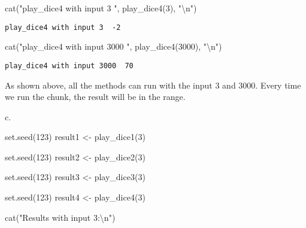 \documentclass[
  letterpaper,
  DIV=11,
  numbers=noendperiod]{scrartcl}
\newenvironment{Shaded}{\begin{snugshade}}{\end{snugshade}}
\newcommand{\DecValTok}[1]{\textcolor[rgb]{0.68,0.00,0.00}{#1}}
\newcommand{\FunctionTok}[1]{\textcolor[rgb]{0.28,0.35,0.67}{#1}}
\newcommand{\NormalTok}[1]{\textcolor[rgb]{0.00,0.23,0.31}{#1}}
\newcommand{\OtherTok}[1]{\textcolor[rgb]{0.00,0.23,0.31}{#1}}
\newcommand{\SpecialCharTok}[1]{\textcolor[rgb]{0.37,0.37,0.37}{#1}}
\newcommand{\StringTok}[1]{\textcolor[rgb]{0.13,0.47,0.30}{#1}}
\begin{document}
\begin{Shaded}
\begin{Highlighting}[]
\FunctionTok{cat}\NormalTok{(}\StringTok{"play\_dice4 with input 3 "}\NormalTok{, }\FunctionTok{play\_dice4}\NormalTok{(}\DecValTok{3}\NormalTok{), }\StringTok{"}\SpecialCharTok{\textbackslash{}n}\StringTok{"}\NormalTok{)}
\end{Highlighting}
\end{Shaded}

\begin{verbatim}
play_dice4 with input 3  -2 
\end{verbatim}

\begin{Shaded}
\begin{Highlighting}[]
\FunctionTok{cat}\NormalTok{(}\StringTok{"play\_dice4 with input 3000 "}\NormalTok{, }\FunctionTok{play\_dice4}\NormalTok{(}\DecValTok{3000}\NormalTok{), }\StringTok{"}\SpecialCharTok{\textbackslash{}n}\StringTok{"}\NormalTok{)}
\end{Highlighting}
\end{Shaded}

\begin{verbatim}
play_dice4 with input 3000  70 
\end{verbatim}

As shown above, all the methods can run with the input 3 and 3000. Every
time we run the chunk, the result will be in the range.

c.

\begin{Shaded}
\begin{Highlighting}[]
\FunctionTok{set.seed}\NormalTok{(}\DecValTok{123}\NormalTok{)}
\NormalTok{result1 }\OtherTok{\textless{}{-}} \FunctionTok{play\_dice1}\NormalTok{(}\DecValTok{3}\NormalTok{)}

\FunctionTok{set.seed}\NormalTok{(}\DecValTok{123}\NormalTok{)}
\NormalTok{result2 }\OtherTok{\textless{}{-}} \FunctionTok{play\_dice2}\NormalTok{(}\DecValTok{3}\NormalTok{)}

\FunctionTok{set.seed}\NormalTok{(}\DecValTok{123}\NormalTok{)}
\NormalTok{result3 }\OtherTok{\textless{}{-}} \FunctionTok{play\_dice3}\NormalTok{(}\DecValTok{3}\NormalTok{)}

\FunctionTok{set.seed}\NormalTok{(}\DecValTok{123}\NormalTok{)}
\NormalTok{result4 }\OtherTok{\textless{}{-}} \FunctionTok{play\_dice4}\NormalTok{(}\DecValTok{3}\NormalTok{)}

\FunctionTok{cat}\NormalTok{(}\StringTok{"Results with input 3:}\SpecialCharTok{\textbackslash{}n}\StringTok{"}\NormalTok{)}
\end{Highlighting}
\end{Shaded}
\end{document}
